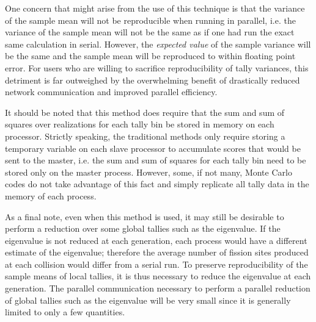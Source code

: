 One concern that might arise from the use of this technique is that the variance
of the sample mean will not be reproducible when running in parallel, i.e. the
variance of the sample mean will not be the same as if one had run the exact
same calculation in serial. However, the {\it expected value} of the sample
variance will be the same and the sample mean will be reproduced to within
floating point error. For users who are willing to sacrifice reproducibility of
tally variances, this detriment is far outweighed by the overwhelming benefit of
drastically reduced network communication and improved parallel efficiency.

It should be noted that this method does require that the sum and sum of squares
over realizations for each tally bin be stored in memory on each
processor. Strictly speaking, the traditional methods only require storing a
temporary variable on each slave processor to accumulate scores that would be
sent to the master, i.e. the sum and sum of squares for each tally bin need to
be stored only on the master process. However, some, if not many, Monte Carlo
codes do not take advantage of this fact and simply replicate all tally data in
the memory of each process.

As a final note, even when this method is used, it may still be desirable to
perform a reduction over some global tallies such as the eigenvalue. If the
eigenvalue is not reduced at each generation, each process would have a
different estimate of the eigenvalue; therefore the average number of fission
sites produced at each collision would differ from a serial run. To preserve
reproducibility of the sample means of local tallies, it is thus necessary to
reduce the eigenvalue at each generation. The parallel communication necessary
to perform a parallel reduction of global tallies such as the eigenvalue will be
very small since it is generally limited to only a few quantities.
